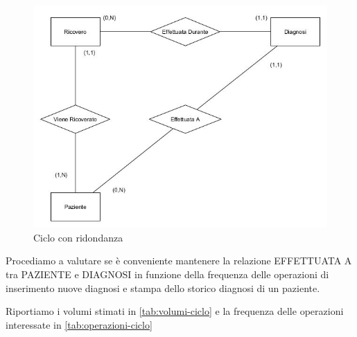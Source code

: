\documentclass{article}
\begin{document}
\begin{figure}[H] %
	\centering
	\includegraphics[width=\linewidth]{schema3}
	\caption{Ciclo con ridondanza}
	\label{fig:ciclo-ridondanza}
\end{figure}
Procediamo a valutare se è conveniente mantenere la relazione EFFETTUATA A tra PAZIENTE e DIAGNOSI in funzione della frequenza delle operazioni di inserimento nuove diagnosi e stampa dello storico diagnosi di un paziente.


Riportiamo i volumi stimati in \autoref{tab:volumi-ciclo} e la frequenza delle operazioni interessate in \autoref{tab:operazioni-ciclo}
\end{document}
